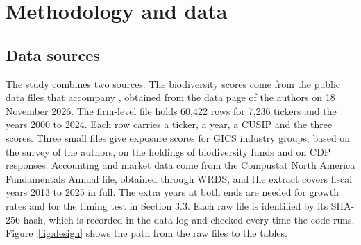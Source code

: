 \documentclass[12pt,a4paper]{article}
\begin{document}
\section{Methodology and data}

\subsection{Data sources}

The study combines two sources. The biodiversity scores come from the public data files that accompany \citet{giglio2026}, obtained from the data page of the authors on 18 November 2026. The firm-level file holds 60,422 rows for 7,236 tickers and the years 2000 to 2024. Each row carries a ticker, a year, a CUSIP and the three scores. Three small files give exposure scores for GICS industry groups, based on the survey of the authors, on the holdings of biodiversity funds and on CDP responses. Accounting and market data come from the Compustat North America Fundamentals Annual file, obtained through WRDS, and the extract covers fiscal years 2013 to 2025 in full. The extra years at both ends are needed for growth rates and for the timing test in Section 3.3. Each raw file is identified by its SHA-256 hash, which is recorded in the data log and checked every time the code runs. Figure~\ref{fig:design} shows the path from the raw files to the tables.
\end{document}
